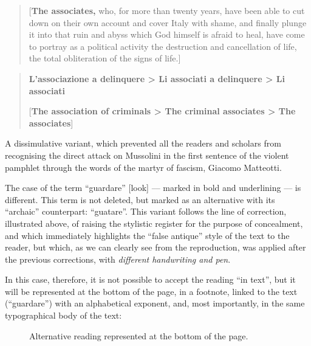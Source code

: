 \begin{paper}
\begin{quote}
\vspace{1em}

[\textbf{The associates,} who, for more than twenty years, have been able
to cut down on their own account and cover Italy with shame, and finally
plunge it into that ruin and abyss which God himself is afraid to heal,
have come to portray as a political activity the destruction and
cancellation of life, the total obliteration of the signs of
life.]
\begin{flushright}
\parencite[21]{gadda_eros_2004}
\end{flushright}
\end{quote}

\begin{quote}


\textbf{L'associazione a delinquere \textgreater{} Li associati a
delinquere \textgreater{} Li associati}    

\vspace{1em}

[\textbf{The association of criminals \textgreater{} The criminal associates \textgreater{} The associates}]    
\end{quote}

A dissimulative variant, which prevented all the readers and scholars
from recognising the
direct attack on Mussolini in the first sentence of the violent pamphlet through the words of the martyr of fascism,
Giacomo Matteotti.

The case of the term ``guardare'' [look] –– marked in bold and underlining –– is
different. This term is not deleted, but marked as an alternative with
its ``archaic'' counterpart: ``guatare''. This variant
 follows the line of correction, illustrated above, of raising the
stylistic register for the purpose of concealment, and which immediately
highlights  the ``false antique'' style of the text to the reader, but which,
as we can clearly see from the reproduction, was applied after the
previous corrections, with \emph{different handwriting and pen}.

In this case, therefore, it is not possible to accept the reading ``in
text'', but it will be represented at the bottom of the page, in
a footnote, linked to the text (``guardare'') with an alphabetical
exponent, and, most importantly, in the same typographical body of the
text:

\begin{figure}[H]
    \centering
    \caption{Alternative reading represented at the bottom of the page.}
    \label{fig:italia2}
\end{figure}


\end{paper}
